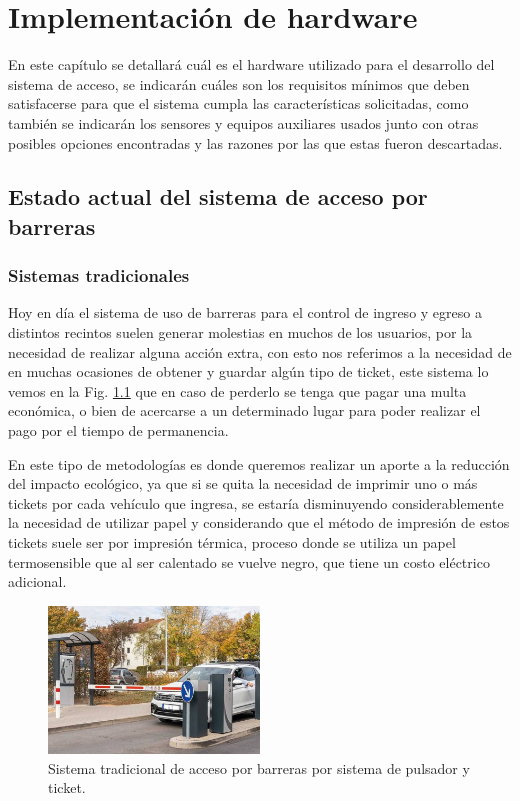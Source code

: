 \chapter{Implementación de hardware}
En este capítulo se detallará cuál es el hardware utilizado para el desarrollo del sistema de acceso, se indicarán cuáles
son los requisitos mínimos que deben satisfacerse para que el sistema cumpla las características solicitadas, como
también se indicarán los sensores y equipos auxiliares usados junto con otras posibles opciones encontradas y las
razones por las que estas fueron descartadas.


\section{Estado actual del sistema de acceso por barreras}

\subsection{Sistemas tradicionales}

Hoy en día el sistema de uso de barreras para el control de ingreso y egreso a distintos recintos suelen generar molestias
en muchos de los usuarios, por la necesidad de realizar alguna acción extra, con esto nos referimos a la necesidad de
en muchas ocasiones de obtener y guardar algún tipo de ticket, este sistema lo vemos en la Fig. \ref{fig:sistema-tradicional}
que en caso de perderlo se tenga que pagar una multa económica, o bien de acercarse a un determinado lugar para poder realizar el pago por el tiempo de permanencia.

En este tipo de metodologías es donde queremos realizar un aporte a la reducción del impacto ecológico, ya que si se quita
la necesidad de imprimir uno o más tickets por cada vehículo que ingresa, se estaría disminuyendo considerablemente la
necesidad de utilizar papel y considerando que el método de impresión de estos tickets suele ser por impresión térmica,
proceso donde se utiliza un papel termosensible que al ser calentado se vuelve negro, que tiene un costo 
eléctrico adicional.
\begin{figure}
    \centering
    \includegraphics[width=0.5\textwidth]{imgs/sistema-control-acceso-barreras.jpg}
    \caption{Sistema tradicional de acceso por barreras por sistema de pulsador y ticket.}
    \label{fig:sistema-tradicional}
\end{figure}

